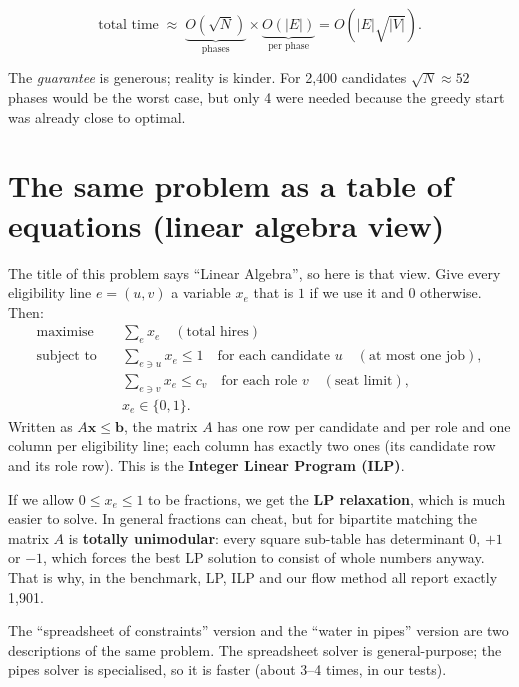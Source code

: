\documentclass[11pt]{article}
\begin{document}
\[
 \text{total time}\;\approx\; \underbrace{O(\sqrt N)}_{\text{phases}} \times \underbrace{O(|E|)}_{\text{per phase}} = O(|E|\sqrt{|V|}).
\]

\begin{remark}
The \emph{guarantee} is generous; reality is kinder. For 2{,}400 candidates $\sqrt N\approx 52$ phases would be the worst case, but only 4 were needed because the greedy start was already close to optimal.
\end{remark}

\section{The same problem as a table of equations (linear algebra view)}\label{sec:ilp}

The title of this problem says ``Linear Algebra'', so here is that view. Give every eligibility line $e=(u,v)$ a variable $x_e$ that is $1$ if we use it and $0$ otherwise. Then:
\begin{align*}
 \text{maximise}\quad & \sum_e x_e \quad(\text{total hires})\\
 \text{subject to}\quad & \sum_{e\ni u} x_e \le 1 \quad\text{for each candidate } u \quad(\text{at most one job}),\\
 & \sum_{e\ni v} x_e \le c_v \quad\text{for each role } v \quad(\text{seat limit}),\\
 & x_e\in\{0,1\}.
\end{align*}
Written as $A\mathbf x\le \mathbf b$, the matrix $A$ has one row per candidate and per role and one column per eligibility line; each column has exactly two ones (its candidate row and its role row). This is the \textbf{Integer Linear Program (ILP)}.

If we allow $0\le x_e\le 1$ to be fractions, we get the \textbf{LP relaxation}, which is much easier to solve. In general fractions can cheat, but for bipartite matching the matrix $A$ is \textbf{totally unimodular}: every square sub-table has determinant $0$, $+1$ or $-1$, which forces the best LP solution to consist of whole numbers anyway. That is why, in the benchmark, LP, ILP and our flow method all report exactly 1{,}901.

\begin{plain}
The ``spreadsheet of constraints'' version and the ``water in pipes'' version are two descriptions of the same problem. The spreadsheet solver is general-purpose; the pipes solver is specialised, so it is faster (about 3--4 times, in our tests).
\end{plain}
\end{document}
